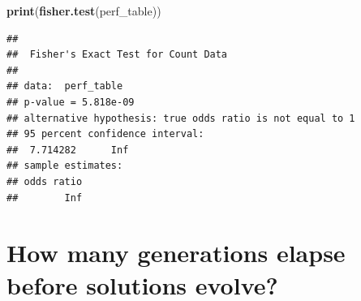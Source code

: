 \documentclass[]{book}
\newenvironment{Shaded}{\begin{snugshade}}{\end{snugshade}}
\newcommand{\KeywordTok}[1]{\textcolor[rgb]{0.13,0.29,0.53}{\textbf{#1}}}
\newcommand{\NormalTok}[1]{#1}
\begin{document}
\begin{Shaded}
\begin{Highlighting}[]
\KeywordTok{print}\NormalTok{(}\KeywordTok{fisher.test}\NormalTok{(perf_table))}
\end{Highlighting}
\end{Shaded}

\begin{verbatim}
## 
##  Fisher's Exact Test for Count Data
## 
## data:  perf_table
## p-value = 5.818e-09
## alternative hypothesis: true odds ratio is not equal to 1
## 95 percent confidence interval:
##  7.714282      Inf
## sample estimates:
## odds ratio 
##        Inf
\end{verbatim}

\hypertarget{how-many-generations-elapse-before-solutions-evolve-1}{%
\section{How many generations elapse before solutions evolve?}\label{how-many-generations-elapse-before-solutions-evolve-1}}
\end{document}
